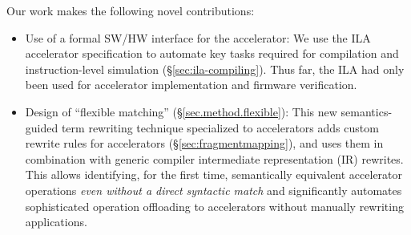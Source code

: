 Our work makes the following novel contributions:
\begin{itemize}

  \item Use of a formal SW/HW interface for the accelerator: We use the ILA accelerator specification 
  to automate key tasks required for compilation and instruction-level simulation (\S\ref{sec:ila-compiling}). %
  Thus far, the ILA had only been used for accelerator implementation and firmware verification.
  
  \item Design of  ``flexible matching'' (\S\ref{sec.method.flexible}): This new semantics-guided term rewriting technique specialized to accelerators adds 
  custom rewrite rules for accelerators (\S\ref{sec:fragmentmapping}), and uses them in combination with  generic compiler intermediate representation (IR) rewrites. 
  This allows identifying, for the first time, semantically equivalent accelerator operations \emph{even without a direct syntactic match} %
  and significantly automates sophisticated operation offloading to accelerators without manually rewriting applications. 
  


\end{itemize}
